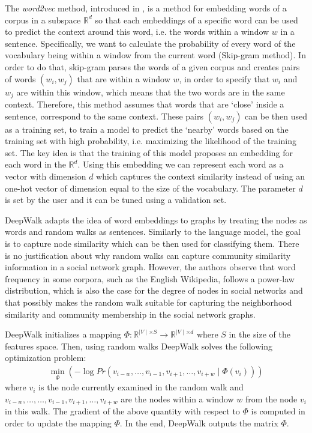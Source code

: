 The \emph{word2vec} method, introduced in \cite{mikolov2013efficient}, is a
method for embedding words of a corpus in a subspace $\mathbb{R}^d$ so that
each embeddings of a specific word can be used to predict the context around this
word, i.e. the words within a window $w$ in a sentence. Specifically, we
want to calculate the probability of every word of the vocabulary being
within a window from the current word (Skip-gram method).
In order to do that, skip-gram parses the words of a given corpus and creates
pairs of words $(w_i, w_j)$ that are within a window $w$, in order to specify
that $w_i$ and $w_j$ are within this window, which means that the two words
are in the same context. Therefore, this method assumes that words that are
`close' inside a sentence, correspond to the same context. These pairs
$(w_i, w_j)$ can be then used as a training set, to train a model to predict the
`nearby' words based on the training set with high probability, i.e. maximizing
the likelihood of the training set. The key idea is that the training of this
model proposes an embedding for each word in the $\mathbb{R}^d$.
Using this embedding we can represent each word as a vector with dimension $d$
which captures the context similarity instead of using an one-hot vector of
dimension equal to the size of the vocabulary. The parameter $d$ is set by the
user and it can be tuned using a validation set.

DeepWalk adapts the idea of word embeddings to graphs by treating the nodes as
words and random walks as sentences. Similarly to the language model, the goal
is to capture node similarity which can be then used for classifying them.
There is no justification about why random walks can capture community
similarity information in a social network graph. However, the authors
observe that word frequency in some corpora, such as the English Wikipedia,
follows a power-law distribution, which is also the case for the degree of nodes
in social networks and that
possibly makes the random walk suitable for capturing the neighborhood
similarity and community membership in the social network graphs.

DeepWalk initializes a mapping
$\Phi: \mathbb{R}^{\mid V \mid \times S} \to \mathbb{R}^{\mid V\mid \times d}$
where $S$ in the size of the features space. Then, using random walks DeepWalk
solves the following optimization problem:
\begin{align}
    \min_{\Phi}
        \left (-\log{Pr({v_{i-w},
                \ldots, v_{i-1}, v_{i+1},
                \ldots , v_{i+w}} \mid \Phi(v_i))}
        \right )
\end{align}
where $v_i$ is the node currently examined in the random walk and
$v_{i-w}, \ldots, \ldots, v_{i-1}, v_{i+1},\ldots, v_{i+w}$ are the nodes
within a window $w$ from the node $v_i$ in this walk. The gradient of the above
quantity with respect to $\Phi$ is
computed in order to update the mapping $\Phi$. In the end, DeepWalk outputs
the matrix $\Phi$.

